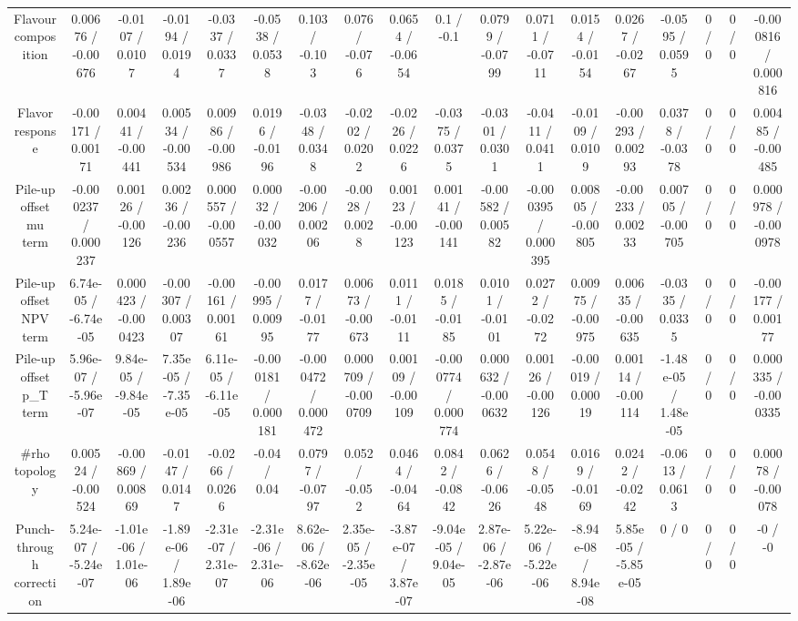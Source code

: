 \documentclass[10pt]{article}
\begin{document}
\begin{table}[htbp]
\begin{center}
\begin{tabular}{|c|c|c|c|c|c|c|c|c|c|c|c|c|c|c|c|c|c|}
  Flavour composition & 0.00676 / -0.00676 & -0.0107 / 0.0107 & -0.0194 / 0.0194 & -0.0337 / 0.0337 & -0.0538 / 0.0538 & 0.103 / -0.103 & 0.076 / -0.076 & 0.0654 / -0.0654 & 0.1 / -0.1 & 0.0799 / -0.0799 & 0.0711 / -0.0711 & 0.0154 / -0.0154 & 0.0267 / -0.0267 & -0.0595 / 0.0595 & 0 / 0 & 0 / 0 & -0.000816 / 0.000816 \\ 
  Flavor response & -0.00171 / 0.00171 & 0.00441 / -0.00441 & 0.00534 / -0.00534 & 0.00986 / -0.00986 & 0.0196 / -0.0196 & -0.0348 / 0.0348 & -0.0202 / 0.0202 & -0.0226 / 0.0226 & -0.0375 / 0.0375 & -0.0301 / 0.0301 & -0.0411 / 0.0411 & -0.0109 / 0.0109 & -0.00293 / 0.00293 & 0.0378 / -0.0378 & 0 / 0 & 0 / 0 & 0.00485 / -0.00485 \\ 
  Pile-up offset mu term & -0.000237 / 0.000237 & 0.00126 / -0.00126 & 0.00236 / -0.00236 & 0.000557 / -0.000557 & 0.00032 / -0.00032 & -0.00206 / 0.00206 & -0.0028 / 0.0028 & 0.00123 / -0.00123 & 0.00141 / -0.00141 & -0.00582 / 0.00582 & -0.000395 / 0.000395 & 0.00805 / -0.00805 & -0.00233 / 0.00233 & 0.00705 / -0.00705 & 0 / 0 & 0 / 0 & 0.000978 / -0.000978 \\ 
  Pile-up offset NPV term & 6.74e-05 / -6.74e-05 & 0.000423 / -0.000423 & -0.00307 / 0.00307 & -0.00161 / 0.00161 & -0.00995 / 0.00995 & 0.0177 / -0.0177 & 0.00673 / -0.00673 & 0.0111 / -0.0111 & 0.0185 / -0.0185 & 0.0101 / -0.0101 & 0.0272 / -0.0272 & 0.00975 / -0.00975 & 0.00635 / -0.00635 & -0.0335 / 0.0335 & 0 / 0 & 0 / 0 & -0.00177 / 0.00177 \\ 
  Pile-up offset p_{T} term & 5.96e-07 / -5.96e-07 & 9.84e-05 / -9.84e-05 & 7.35e-05 / -7.35e-05 & 6.11e-05 / -6.11e-05 & -0.000181 / 0.000181 & -0.000472 / 0.000472 & 0.000709 / -0.000709 & 0.00109 / -0.00109 & -0.000774 / 0.000774 & 0.000632 / -0.000632 & 0.00126 / -0.00126 & -0.00019 / 0.00019 & 0.00114 / -0.00114 & -1.48e-05 / 1.48e-05 & 0 / 0 & 0 / 0 & 0.000335 / -0.000335 \\ 
  #rho topology & 0.00524 / -0.00524 & -0.00869 / 0.00869 & -0.0147 / 0.0147 & -0.0266 / 0.0266 & -0.04 / 0.04 & 0.0797 / -0.0797 & 0.052 / -0.052 & 0.0464 / -0.0464 & 0.0842 / -0.0842 & 0.0626 / -0.0626 & 0.0548 / -0.0548 & 0.0169 / -0.0169 & 0.0242 / -0.0242 & -0.0613 / 0.0613 & 0 / 0 & 0 / 0 & 0.00078 / -0.00078 \\ 
  Punch-through correction & 5.24e-07 / -5.24e-07 & -1.01e-06 / 1.01e-06 & -1.89e-06 / 1.89e-06 & -2.31e-07 / 2.31e-07 & -2.31e-06 / 2.31e-06 & 8.62e-06 / -8.62e-06 & 2.35e-05 / -2.35e-05 & -3.87e-07 / 3.87e-07 & -9.04e-05 / 9.04e-05 & 2.87e-06 / -2.87e-06 & 5.22e-06 / -5.22e-06 & -8.94e-08 / 8.94e-08 & 5.85e-05 / -5.85e-05 & 0 / 0 & 0 / 0 & 0 / 0 & -0 / -0 \\ 

\end{tabular}
\end{center}
\end{table}
\end{document}

